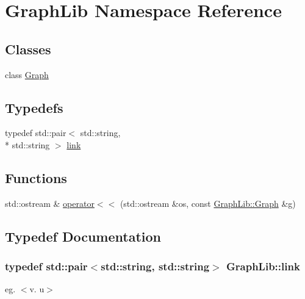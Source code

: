 \hypertarget{namespaceGraphLib}{\section{Graph\-Lib Namespace Reference}
\label{namespaceGraphLib}
}
\subsection*{Classes}
\begin{DoxyCompactItemize}
\item 
class \hyperlink{classGraphLib_1_1Graph}{Graph}
\end{DoxyCompactItemize}
\subsection*{Typedefs}
\begin{DoxyCompactItemize}
\item 
typedef std\-::pair$<$ std\-::string, \\*
std\-::string $>$ \hyperlink{namespaceGraphLib_a377ccf6aaeadf5536de135d66360d225}{link}
\end{DoxyCompactItemize}
\subsection*{Functions}
\begin{DoxyCompactItemize}
\item 
std\-::ostream \& \hyperlink{namespaceGraphLib_af3b2bbc45436f913f252029fd7da7156}{operator$<$$<$} (std\-::ostream \&os, const \hyperlink{classGraphLib_1_1Graph}{Graph\-Lib\-::\-Graph} \&g)
\end{DoxyCompactItemize}


\subsection{Typedef Documentation}
\hypertarget{namespaceGraphLib_a377ccf6aaeadf5536de135d66360d225}{
\subsubsection[{link}]{\setlength{\rightskip}{0pt plus 5cm}typedef std\-::pair$<$std\-::string, std\-::string$>$ {\bf Graph\-Lib\-::link}}}\label{namespaceGraphLib_a377ccf6aaeadf5536de135d66360d225}
eg. $<$v. u$>$ 

